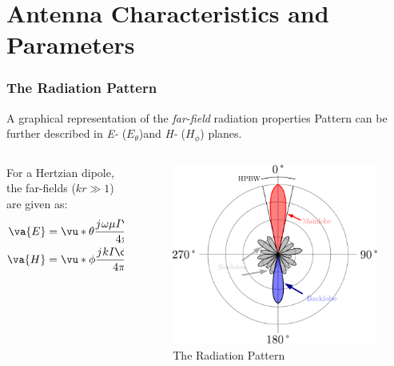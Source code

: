\documentclass[10pt, compress]{beamer}
\renewcommand{\O}{\omega}  %
\renewcommand{\u}{\mu}  %
\renewcommand{\j}{{j}\mkern1mu} %
\begin{document}
\section{Antenna Characteristics and Parameters}


\begin{frame}
  \frametitle{The Radiation Pattern}
  \begin{outline}
    \1 A graphical representation of the \textit{far-field} radiation properties
    \1 Pattern can be further described in \textit{E-} ($E_{\theta}$)and \textit{H-} ($H_{\phi}$) planes.
    \begin{columns}[T] %
      \begin{column}{.35\textwidth}
        For a Hertzian dipole, the far-fields ($k r \gg 1$) are given as:
        \begin{align*}
          \va{E} & = \vu*{\theta} \frac{ \j \O \u I  \dd{l}}{4 \pi r} \sin(\theta) \\
          \va{H} & = \vu*{\phi} \frac{ \j k I  \dd{l}}{4 \pi r} \sin(\theta)
        \end{align*}
      \end{column}
      \begin{column}[T]{.65\textwidth}
        \begin{figure}
          \centering
          \includegraphics[width=.9\textwidth]{src/lobes.pdf}
          \caption{The Radiation Pattern}
        \end{figure}
      \end{column}%
    \end{columns}
  \end{outline}
\end{frame}
\end{document}
